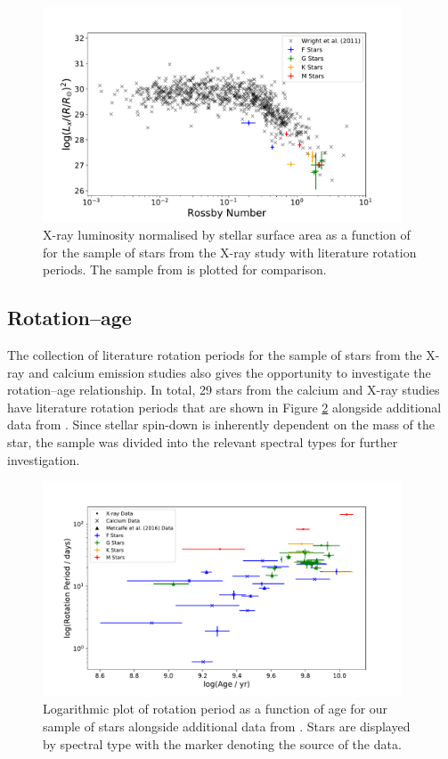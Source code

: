 \begin{figure}
    \centering
    \includegraphics[width=0.95\textwidth]{Figures/5-Activity_rotation/lx_v_R0.pdf}
    \caption[$L_{x}$ as a function of \Ro]{X-ray luminosity normalised by stellar surface area as a function of \Ro for the sample of stars from the X-ray study with literature rotation periods. The sample from \citet{Wright_etal_2011} is plotted for comparison.}
    \label{fig:lx_v_ro}
\end{figure}

\subsection{Rotation--age}
\label{Chp5_results_rotation_age}
The collection of literature rotation periods for the sample of stars from the X-ray and calcium emission studies also gives the opportunity to investigate the rotation--age relationship. In total, 29 stars from the calcium and X-ray studies have literature rotation periods that are shown in Figure \ref{fig:full_sample_prot_v_age} alongside additional data from \citet{Metcalfe_etal_2016}. Since stellar spin-down is inherently dependent on the mass of the star, the sample was divided into the relevant spectral types for further investigation. 

\begin{figure}
    \centering
    \includegraphics[width=0.95\textwidth]{Figures/5-Activity_rotation/prot_v_age.pdf}
    \caption{Logarithmic plot of rotation period as a function of age for our sample of stars alongside additional data from \citet{Metcalfe_etal_2016}. Stars are displayed by spectral type with the marker denoting the source of the data.}
    \label{fig:full_sample_prot_v_age}
\end{figure}


